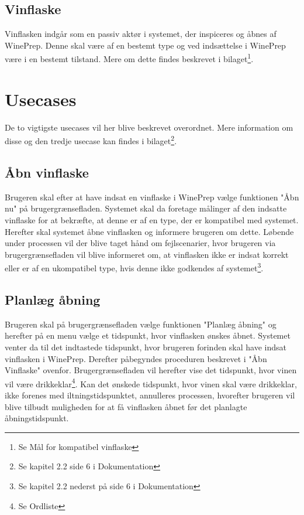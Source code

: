 \subsection{Vinflaske}
Vinflasken indgår som en passiv aktør i systemet, der inspiceres og åbnes af WinePrep. Denne skal være af en bestemt type og ved indsættelse i WinePrep være i 
en bestemt tilstand. Mere om dette findes beskrevet i bilaget\footnote{Se Mål for kompatibel vinflaske}.

\section{Usecases}
De to vigtigste usecases vil her blive beskrevet overordnet. Mere information om disse og den tredje usecase kan findes i bilaget\footnote{Se kapitel 2.2 side 6 i Dokumentation}.

\subsection{Åbn vinflaske}
Brugeren skal efter at have indsat en vinflaske i WinePrep vælge funktionen "Åbn nu" på brugergrænsefladen. Systemet skal da foretage målinger af den indsatte 
vinflaske for at bekræfte, at denne er af en type, der er kompatibel med systemet. Herefter skal systemet åbne vinflasken og informere brugeren om dette. 
Løbende under processen vil der blive taget hånd om fejlscenarier, hvor brugeren via brugergrænsefladen vil blive informeret om, at vinflasken ikke er indsat korrekt 
eller er af en ukompatibel type, hvis denne ikke godkendes af systemet\footnote{Se kapitel 2.2 nederst på side 6 i Dokumentation}.

\subsection{Planlæg åbning}
Brugeren skal på brugergrænsefladen vælge funktionen "Planlæg åbning" og herefter på en menu vælge et tidspunkt, hvor 
vinflasken ønskes åbnet. Systemet venter da til det indtastede tidspunkt, hvor brugeren 
forinden skal have indsat vinflasken i WinePrep. Derefter påbegyndes proceduren beskrevet i "Åbn Vinflaske" ovenfor. Brugergrænsefladen vil herefter vise det 
tidspunkt, hvor vinen vil være drikkeklar\footnote{Se Ordliste}. Kan det ønskede tidspunkt, hvor vinen skal være drikkeklar, ikke forenes med iltningstidspunktet, annulleres processen, hvorefter brugeren vil blive tilbudt muligheden for at få vinflasken åbnet før det planlagte
åbningstidspunkt.

